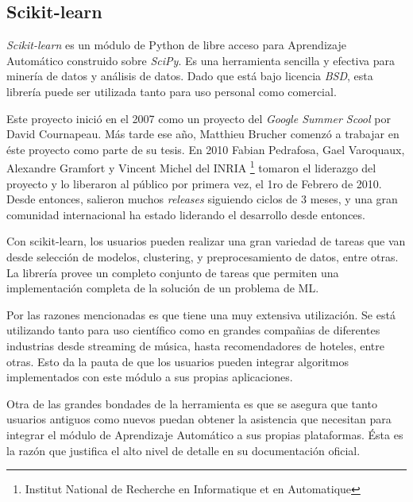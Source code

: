 \subsection{Scikit-learn}

  \par \textit{Scikit-learn}\cite{scikit-learn, sklearn_review} es un módulo
    de Python de libre acceso para Aprendizaje Automático
    construido sobre \textit{SciPy}\cite{scipy}. Es una herramienta
    sencilla y efectiva para minería de datos y análisis de datos. Dado que está bajo
    licencia \textit{BSD}, esta librería puede ser utilizada tanto
    para uso personal como comercial.

  \par Este proyecto inició en el 2007 como un proyecto del \textit{Google Summer Scool} por David
    Cournapeau. Más tarde ese año, Matthieu Brucher comenzó a trabajar en éste proyecto
    como parte de su tesis. En 2010 Fabian Pedrafosa, Gael Varoquaux, Alexandre
    Gramfort y Vincent Michel del INRIA \footnote{Institut National de Recherche
    en Informatique et en Automatique} tomaron el liderazgo del proyecto y lo liberaron
    al público por primera vez, el 1ro de Febrero de 2010. Desde entonces, salieron muchos
    \textit{releases} siguiendo ciclos de 3 meses, y una gran comunidad internacional
    ha estado liderando el desarrollo desde entonces.

  \par Con scikit-learn, los usuarios pueden realizar una gran variedad de tareas
    que van desde selección de modelos, clustering, y preprocesamiento de datos, entre otras.
    La librería provee un completo conjunto de tareas que permiten una
    implementación completa de la solución de un problema de ML.

    Por las razones mencionadas es que tiene una muy extensiva utilización.
    Se está utilizando tanto para uso científico como en
    grandes compañias de diferentes industrias desde streaming de música, hasta
    recomendadores de hoteles, entre otras. Esto da la pauta de que los usuarios pueden
    integrar algoritmos implementados con este módulo a sus propias aplicaciones.

Otra de las grandes bondades de la herramienta es que se asegura que tanto usuarios
antiguos como nuevos puedan obtener la asistencia que necesitan para integrar
el módulo de Aprendizaje Automático a sus propias plataformas. Ésta es la razón
que justifica el alto nivel de detalle en su documentación oficial.



